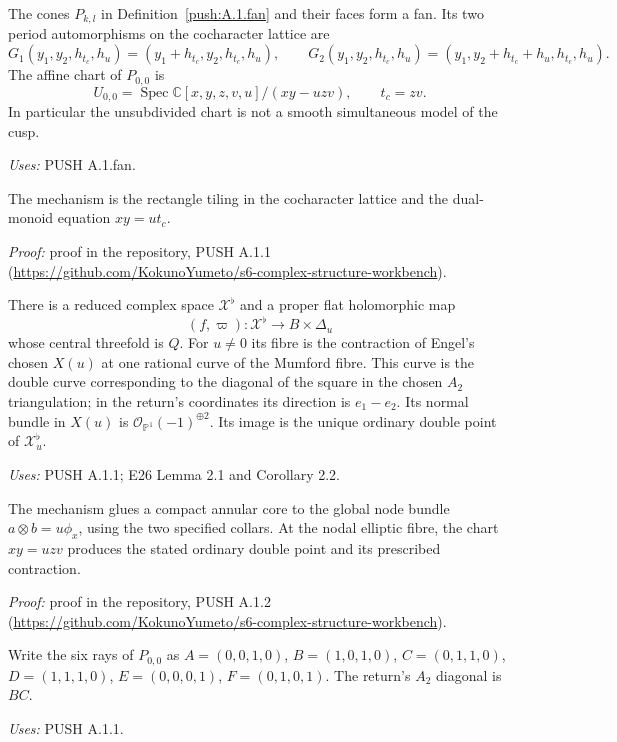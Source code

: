 \begin{announcement}[PUSH A.1.1; A]\label{push:A.1.1}
The cones $P_{k,l}$ in Definition~\ref{push:A.1.fan} and their faces form a fan. Its two
period automorphisms on the cocharacter lattice are
\[
 G_1(y_1,y_2,h_{t_c},h_u)=(y_1+h_{t_c},y_2,h_{t_c},h_u),\qquad
 G_2(y_1,y_2,h_{t_c},h_u)=(y_1,y_2+h_{t_c}+h_u,h_{t_c},h_u).
\]
The affine chart of $P_{0,0}$ is
\[
 U_{0,0}=\operatorname{Spec}\mathbb C[x,y,z,v,u]/(xy-uzv),
 \qquad t_c=zv.
\]
In particular the unsubdivided chart is not a smooth simultaneous
model of the cusp.
\end{announcement}
\noindent\emph{Uses:} PUSH A.1.fan.\par

The mechanism is the rectangle tiling in the cocharacter lattice and the dual-monoid equation $xy=ut_c$.

\noindent\emph{Proof:} proof in the repository, PUSH A.1.1 (\url{https://github.com/KokunoYumeto/s6-complex-structure-workbench}).

\begin{announcement}[PUSH A.1.2; A]\label{push:A.1.2}
There is a reduced complex space $\mathcal X^\flat$ and a proper flat
holomorphic map
\[
 (f,\varpi):\mathcal X^\flat\longrightarrow B\times\Delta_u
\]
whose central threefold is $Q$. For $u\ne0$ its fibre is the
contraction of Engel's chosen $X(u)$ at one rational curve of the
Mumford fibre. This curve is the double curve corresponding to the
diagonal of the square in the chosen $A_2$ triangulation; in the
return's coordinates its direction is $e_1-e_2$. Its normal bundle
in $X(u)$ is $\mathcal O_{\mathbb P^1}(-1)^{\oplus2}$. Its image is
the unique ordinary double point of $\mathcal X^\flat_u$.
\end{announcement}
\noindent\emph{Uses:} PUSH A.1.1; E26 Lemma 2.1 and Corollary 2.2.\par

The mechanism glues a compact annular core to the global node bundle $a\otimes b=u\phi_x$, using the two specified collars. At the nodal elliptic fibre, the chart $xy=uzv$ produces the stated ordinary double point and its prescribed contraction.

\noindent\emph{Proof:} proof in the repository, PUSH A.1.2 (\url{https://github.com/KokunoYumeto/s6-complex-structure-workbench}).

\begin{definition}\label{push:A.2.rays}
Write the six rays of $P_{0,0}$ as
$A=(0,0,1,0)$, $B=(1,0,1,0)$, $C=(0,1,1,0)$,
$D=(1,1,1,0)$, $E=(0,0,0,1)$, $F=(0,1,0,1)$.
The return's $A_2$ diagonal is $BC$.
\end{definition}
\noindent\emph{Uses:} PUSH A.1.1.\par

